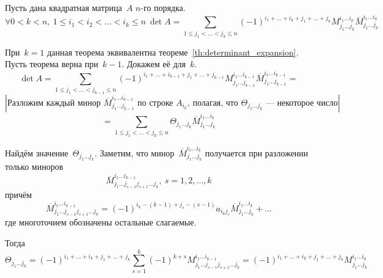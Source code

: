 \begin{theorem}[Лапласа]
Пусть дана квадратная матрица~$A$ $n$-го порядка.
\begin{equation*}
\forall 0 < k < n, \ 1 \leqslant i_1 < i_2 < \ldots < i_k \leqslant n \
\det A = \sum_{1 \leqslant j_1 < \ldots < j_k \leqslant n}
(-1)^{i_1 + \ldots + i_k + j_1 + \ldots + j_k}
M_{j_1 \ldots j_k}^{i_1 \ldots i_k}
\overline M_{j_1 \ldots j_k}^{i_1 \ldots i_k}
\end{equation*}
\end{theorem}
\begin{proofmathind}
	\indbase При~$k = 1$ данная теорема эквивалентна теореме~\ref*{th:determinant_expansion}.
	\indstep Пусть теорема верна при~$k - 1$. Докажем её для~$k$.
	\begin{equation*}
	\det A = \sum_{1 \leqslant j_1 < \ldots < j_{k-1} \leqslant n}
	(-1)^{i_1 + \ldots + i_{k-1} + j_1 + \ldots + j_{k-1}}
	M_{j_1 \ldots j_{k-1}}^{i_1 \ldots i_{k-1}}
	\overline M_{j_1 \ldots j_{k-1}}^{i_1 \ldots i_{k-1}} =
	\end{equation*}
	\begin{equation*}
	\left| \text{Разложим каждый минор~$\overline M_{j_1 \ldots j_{k-1}}^{i_1 \ldots i_{k-1}}$ по строке~$A_{i_k}$, полагая, что $\Theta_{j_1 \ldots j_k}$~--- некоторое число} \right|
	\end{equation*}
	\begin{equation*}
	= \sum_{1 \leqslant j_1 < \ldots < j_k \leqslant n}
	\Theta_{j_1 \ldots j_k} \overline M_{j_1 \ldots j_k}^{i_1 \ldots i_k}
	\end{equation*}
	
	Найдём значение~$\Theta_{j_1 \ldots j_k}$.
	Заметим, что минор~$\overline M_{j_1 \ldots j_k}^{i_1 \ldots i_k}$ получается при разложении только миноров
	\begin{equation*}
	\overline M_{j_1 \ldots j_{s-1} j_{s+1} \ldots j_k}^{i_1 \ldots i_{k-1}}, \ s = 1, 2, \ldots, k
	\end{equation*}
	причём
	\begin{equation*}
	\overline M_{j_1 \ldots j_{s-1} j_{s+1} \ldots j_k}^{i_1 \ldots i_{k-1}} =
	(-1)^{i_k - (k - 1) + j_s - (s - 1)} a_{i_k j_s}
	\overline M_{j_1 \ldots j_k}^{i_1 \ldots i_k} + \ldots
	\end{equation*}
	где многоточием обозначены остальные слагаемые.
	
	Тогда
	\begin{equation*}
	\Theta_{j_1 \ldots j_k} =
	(-1)^{i_1 + \ldots + i_k + j_1 + \ldots + j_k}
	\sum_{s=1}^k (-1)^{k+s} M_{j_1 \ldots j_{s-1} j_{s+1} \ldots j_k}^{i_1 \ldots i_{k-1}} =
	(-1)^{i_1 + \ldots + i_k + j_1 + \ldots + j_k}
	M_{j_1 \ldots j_k}^{i_1 \ldots i_k}
	\end{equation*}
	\indend
\end{proofmathind}


